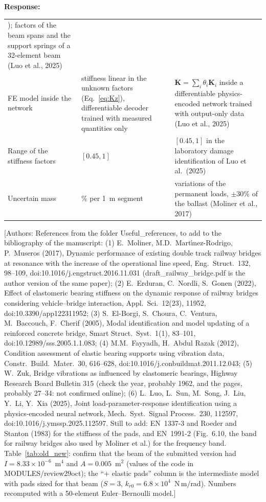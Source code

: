 \documentclass[11pt]{article}
\newenvironment{response}{\par\smallskip\noindent\color{resp}\textbf{Response:}\ }{\par}
\newcommand{\authornote}[1]{\textcolor{note}{\textsf{[Authors: #1]}}}
\begin{document}
\begin{response}
\begin{table}[H]
\begin{tabular}{>{\raggedright\arraybackslash}p{3.1cm}>{\raggedright\arraybackslash}p{4.3cm}%
>{\raggedright\arraybackslash}p{7.4cm}}
2012); factors of the beam spans and the support springs of a 32-element beam (Luo et al., 2025) \\
FE model inside the network & stiffness linear in the unknown factors (Eq.~\eqref{eq:Kz}), differentiable decoder trained
with measured quantities only & $\mathbf{K}=\sum_i\theta_i\mathbf{K}_i$ inside a differentiable physics-encoded network
trained with output-only data (Luo et al., 2025) \\
Range of the stiffness factors & $[0.45,1]$ & $[0.45,1]$ in the laboratory damage identification of Luo et al.\ (2025) \\
Uncertain mass & 5\% per 1~m segment & variations of the permanent loads, $\pm30\%$ of the ballast (Moliner et al.,
2017) \\
\bottomrule
\end{tabular}
\end{table}
\authornote{References from the folder Useful\_references, to add to the bibliography of the manuscript:
(1) E.~Moliner, M.D.~Mart\'{\i}nez-Rodrigo, P.~Museros (2017), Dynamic performance of existing double track railway
bridges at resonance with the increase of the operational line speed, Eng.\ Struct.\ 132, 98--109,
doi:10.1016/j.engstruct.2016.11.031 (draft\_railway\_bridge.pdf is the author version of the same paper);
(2) E.~Erduran, C.~Nordli, S.~Gonen (2022), Effect of elastomeric bearing stiffness on the dynamic response of railway
bridges considering vehicle--bridge interaction, Appl.\ Sci.\ 12(23), 11952, doi:10.3390/app122311952;
(3) S.~El-Borgi, S.~Choura, C.~Ventura, M.~Baccouch, F.~Cherif (2005), Modal identification and model updating of a
reinforced concrete bridge, Smart Struct.\ Syst.\ 1(1), 83--101, doi:10.12989/sss.2005.1.1.083;
(4) M.M.~Fayyadh, H.~Abdul Razak (2012), Condition assessment of elastic bearing supports using vibration data,
Constr.\ Build.\ Mater.\ 30, 616--628, doi:10.1016/j.conbuildmat.2011.12.043;
(5) W.~Zuk, Bridge vibrations as influenced by elastomeric bearings, Highway Research Board Bulletin 315 (check the year,
probably 1962, and the pages, probably 27--34: not confirmed online);
(6) L.~Luo, L.~Sun, M.~Song, J.~Liu, Y.~Li, Y.~Xia (2025), Joint load-parameter-response identification using a
physics-encoded neural network, Mech.\ Syst.\ Signal Process.\ 230, 112597, doi:10.1016/j.ymssp.2025.112597.
Still to add: EN~1337-3 and Roeder and Stanton (1983) for the stiffness of the pads, and EN~1991-2 (Fig.~6.10, the
band for railway bridges also used by Moliner et al.) for the frequency band. Table~\ref{tab:old_new}: confirm that the beam of the submitted version had $I=8.33\times10^{-6}$~m$^4$ and
$A=0.005$~m$^2$ (values of the code in MODULES/review29oct); the ``+ elastic pads'' column is the intermediate model with
pads sized for that beam ($S=3$, $k_{r0}=6.8\times10^{4}$~N\,m/rad). Numbers recomputed with a 50-element
Euler--Bernoulli model.}
\end{response}
\end{document}
